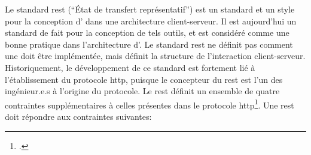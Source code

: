 Le standard \gls{rest} (\enquote{État de transfert représentatif}) est un standard et un style pour la conception d'\api{} dans une architecture client-serveur. Il est aujourd'hui un standard de fait pour la conception de tels outils, et est considéré comme une bonne pratique dans l'architecture d'\api{}. Le standard \gls{rest} ne définit pas comment une \api{} doit être implémentée, mais définit la structure de l'interaction client-serveur. Historiquement, le développement de ce standard est fortement lié à l'établissement du protocole \gls{http}, puisque le concepteur du \gls{rest} est l'un des ingénieur.e.s à l'origine du protocole. Le \gls{rest} définit un ensemble de quatre contraintes supplémentaires à celles présentes dans le protocole \gls{http}\footcite[p. 94]{fielding_architectural_2000}. Une \api{} \gls{rest} doit répondre aux contraintes suivantes:

